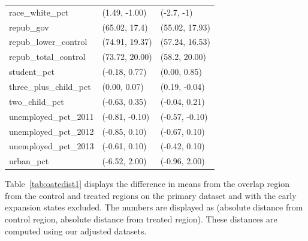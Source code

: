 \documentclass{article}
\begin{document}
\begin{appendix}
\begin{table}[ht]
\begin{tabular}{lll}
  race\_white\_pct & (1.49, -1.00) & (-2.7, -1) \\ 
  repub\_gov & (65.02, 17.4) & (55.02, 17.93) \\ 
  repub\_lower\_control & (74.91, 19.37) & (57.24, 16.53) \\ 
  repub\_total\_control & (73.72, 20.00) & (58.2, 20.00) \\ 
  student\_pct & (-0.18, 0.77) & (0.00, 0.85) \\ 
  three\_plus\_child\_pct & (0.00, 0.07) & (0.19, -0.04) \\ 
  two\_child\_pct & (-0.63, 0.35) & (-0.04, 0.21) \\ 
  unemployed\_pct\_2011 & (-0.81, -0.10) & (-0.57, -0.10) \\ 
  unemployed\_pct\_2012 & (-0.85, 0.10) & (-0.67, 0.10) \\ 
  unemployed\_pct\_2013 & (-0.61, 0.10) & (-0.42, 0.10) \\ 
  urban\_pct & (-6.52, 2.00) & (-0.96, 2.00) \\ 
   \hline
\end{tabular}
\end{table}

Table~\ref{tab:oatedist1} displays the difference in means from the overlap region from the control and treated regions on the primary dataset and with the early expansion states excluded. The numbers are displayed as (absolute distance from control region, absolute distance from treated region). These distances are computed using our adjusted datasets. 


\end{appendix}
\end{document}
